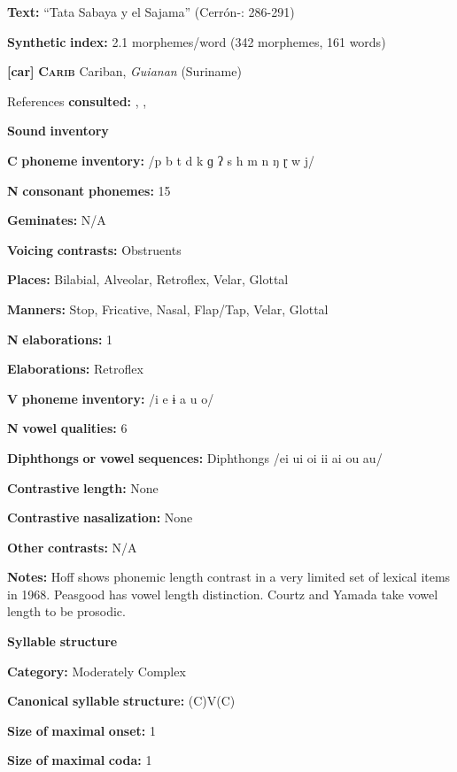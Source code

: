 \begin{styleBody}
\textbf{Text:} “Tata Sabaya y el Sajama” (Cerrón-\citealt{Palomino2006}: 286-291)

\textbf{Synthetic} \textbf{index:} 2.1 morphemes/word (342 morphemes, 161 words)

\textbf{[car]}   \textbf{\textsc{Carib}  }  Cariban, \textit{Guianan} (Suriname)

References \textbf{consulted:} \citet{Courtz2008}, \citet{Hoff1968}, \citet{Peasgood1972}

\textbf{Sound} \textbf{inventory}

\textbf{C} \textbf{phoneme} \textbf{inventory:} /p b t d k ɡ ʔ s h m n ŋ ɽ w j/

\textbf{N} \textbf{consonant} \textbf{phonemes:} 15

\textbf{Geminates:} N/A

\textbf{Voicing} \textbf{contrasts:} Obstruents

\textbf{Places:} Bilabial, Alveolar, Retroflex, Velar, Glottal

\textbf{Manners:} Stop, Fricative, Nasal, Flap/Tap, Velar, Glottal

\textbf{N} \textbf{elaborations:} 1

\textbf{Elaborations:} Retroflex

\textbf{V} \textbf{phoneme} \textbf{inventory:} /i e ɨ a u o/

\textbf{N} \textbf{vowel} \textbf{qualities:} 6

\textbf{Diphthongs} \textbf{or} \textbf{vowel} \textbf{sequences:} Diphthongs /ei ui oi ii ai ou au/

\textbf{Contrastive} \textbf{length:} None

\textbf{Contrastive} \textbf{nasalization:} None

\textbf{Other} \textbf{contrasts:} N/A

\textbf{Notes:} Hoff shows phonemic length contrast in a very limited set of lexical items in 1968. Peasgood has vowel length distinction. Courtz and Yamada take vowel length to be prosodic.

\textbf{Syllable} \textbf{structure}

\textbf{Category:} Moderately Complex

\textbf{Canonical} \textbf{syllable} \textbf{structure:} (C)V(C) \citep[22-7]{Courtz2008}

\textbf{Size} \textbf{of} \textbf{maximal} \textbf{onset:} 1

\textbf{Size} \textbf{of} \textbf{maximal} \textbf{coda:} 1


\end{styleBody}
